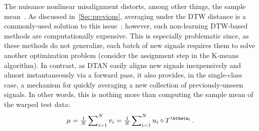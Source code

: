 The nuisance nonlinear misalignment distorts,
among other things, the sample mean~\cite{wigley:climate:1984:average,Gusfield:Cambridge:1997:Steiner}. As discussed in~\autoref{Sec:previous}, averaging under the DTW distance 
is a commonly-used solution to this issue~\cite{Petitjean:2011:global,Petitjean:2014:dynamic,cuturi:ICML:2014:fast,cuturi:2017:soft}; 
however, such non-learning DTW-based methods are computationally expensive.
This is especially problematic since,
as these methods do not generalize, each batch of new signals requires them to solve another optimization problem (\ie consider the assignment step in the K-means algorithm).
In contrast, as DTAN easily aligns new signals inexpensively and almost instantaneously via a forward pass, it also provides, in the single-class case, a mechanism 
for quickly averaging a new collection of previously-unseen signals.
In other words, this is nothing more than computing the sample mean
of the warped test data: 
\begin{align}
\label{eqn:average}
\mu = \tfrac{1}{N}\sum\nolimits_{i=1}^{N}v_i = \tfrac{1}{N}\sum\nolimits_{i=1}^N u_i \circ T^{\btheta_i}\, .
\end{align}